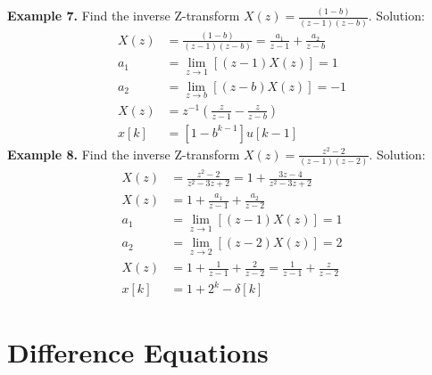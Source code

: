 \documentclass[twoside]{article}
\begin{document}
%
\textbf{Example 7.} Find the  inverse Z-transform $X(z) =
\frac{(1-b)}{(z-1) (z-b)}$. Solution:
%
\begin{align*}
    X(z) &= \frac{(1-b)}{(z-1) (z-b)} = \frac{a_1}{z-1} + 
                     \frac{a_2}{z-b} \\
    a_1 &= \lim_{z \to 1} \left[ (z - 1) X(z) \right] = 1 \\
    a_2 &= \lim_{z \to b} \left[ (z - b) X(z) \right] = -1 \\
   X(z) &= z^{-1} \left( \frac{z}{z-1} - \frac{z}{z-b} \right) \\
   x[k] &= [ 1 - b^{k-1} ] u[k-1]
\end{align*}
%
\textbf{Example 8.} Find the  inverse Z-transform $X(z) =
\frac{z^2 - 2}{(z-1) (z-2)}$. Solution:
%
\begin{align*}
X(z) &= \frac{z^2 - 2}{z^2 - 3 z + 2} = 1 + \frac{3z - 4}{z^2 - 3 z + 2}
\\
    X(z) &= 1 + \frac{a_1}{z-1} + \frac{a_2}{z-2} \\
    a_1 &= \lim_{z \to 1} \left[ (z -1) X(z) \right] = 1 \\
    a_2 &= \lim_{z \to 2} \left[ (z -2) X(z) \right] = 2 \\
   X(z) &= 1 +\frac{1}{z-1} + \frac{2}{z-2} = \frac{1}{z-1} +
          \frac{z}{z-2} \\
   x[k] &= 1 + 2^k - \delta[k] 
\end{align*}
%

\section*{Difference Equations}
\end{document}
